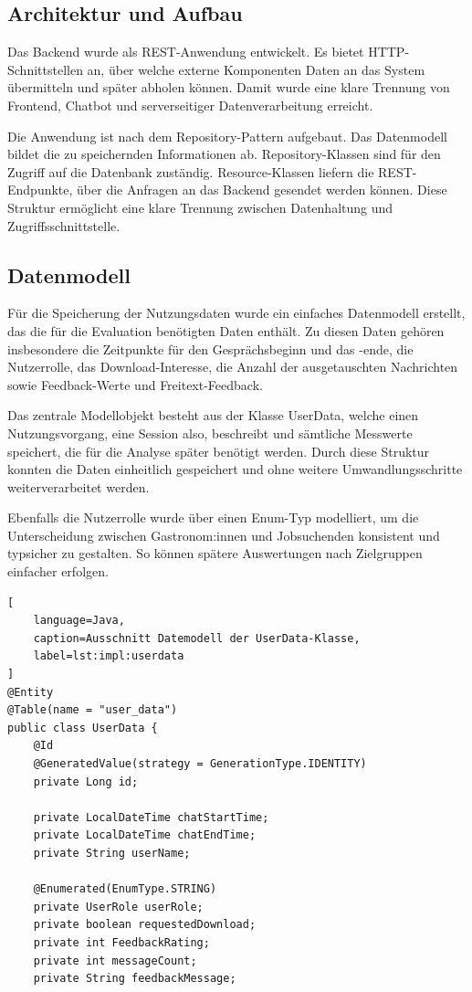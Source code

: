 \subsection{Architektur und Aufbau}

Das Backend wurde als REST-Anwendung entwickelt. Es bietet HTTP-Schnittstellen an, 
über welche externe Komponenten Daten an das System übermitteln und später 
abholen können. Damit wurde eine klare Trennung von Frontend, Chatbot und 
serverseitiger Datenverarbeitung erreicht.

Die Anwendung ist nach dem Repository-Pattern aufgebaut. Das Datenmodell bildet die zu 
speichernden Informationen ab. Repository-Klassen sind für den Zugriff auf die 
Datenbank zuständig. Resource-Klassen liefern die REST-Endpunkte, über die 
Anfragen an das Backend gesendet werden können. Diese Struktur ermöglicht eine 
klare Trennung zwischen Datenhaltung und Zugriffsschnittstelle.

\subsection{Datenmodell}

Für die Speicherung der Nutzungsdaten wurde ein einfaches Datenmodell erstellt, 
das die für die Evaluation benötigten Daten enthält. Zu diesen Daten gehören 
insbesondere die Zeitpunkte für den Gesprächsbeginn und das -ende, die 
Nutzerrolle, das Download-Interesse, die Anzahl der ausgetauschten Nachrichten 
sowie Feedback-Werte und Freitext-Feedback.

Das zentrale Modellobjekt besteht aus der Klasse UserData, welche einen 
Nutzungsvorgang, eine Session also, beschreibt und sämtliche Messwerte speichert, 
die für die Analyse später benötigt werden. Durch diese Struktur konnten die 
Daten einheitlich gespeichert und ohne weitere Umwandlungsschritte 
weiterverarbeitet werden.

Ebenfalls die Nutzerrolle wurde über einen Enum-Typ modelliert, um die 
Unterscheidung zwischen Gastronom:innen und Jobsuchenden konsistent und 
typsicher zu gestalten. So können spätere Auswertungen nach Zielgruppen 
einfacher erfolgen.

\begin{lstlisting}[
    language=Java,
    caption=Ausschnitt Datemodell der UserData-Klasse,
    label=lst:impl:userdata
]
@Entity
@Table(name = "user_data")
public class UserData {
    @Id
    @GeneratedValue(strategy = GenerationType.IDENTITY)
    private Long id;

    private LocalDateTime chatStartTime;
    private LocalDateTime chatEndTime;
    private String userName;

    @Enumerated(EnumType.STRING)
    private UserRole userRole;
    private boolean requestedDownload;
    private int FeedbackRating;
    private int messageCount;
    private String feedbackMessage;
\end{lstlisting}

